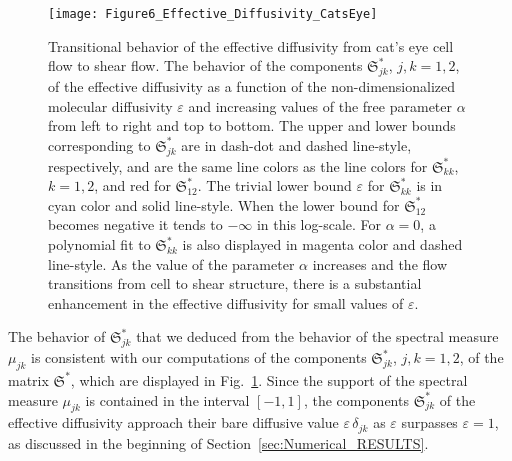 \documentclass[english,12pt,jmp,graphicx]{revtex4-1}
\newcommand{\secref}[1]{Section~\ref{#1}}
\newcommand{\figref}[1]{Fig.~\ref{#1}}
\newcommand{\Sg}{\mathfrak{S}}
\begin{document}
%
\begin{figure}[t]
  \centerline{\texttt{[image: Figure6\_Effective\_Diffusivity\_CatsEye]}} 
\caption{%
  Transitional behavior of the effective diffusivity from cat's eye
  cell flow to shear flow. The behavior of the components
  $\Sg^*_{jk}$, $j,k=1,2$, of the effective diffusivity as a function
  of the non-dimensionalized molecular diffusivity $\varepsilon$ and
  increasing values of 
  the free parameter $\alpha$ from left to right and top to bottom. The
  upper and lower bounds corresponding to $\Sg^*_{jk}$ are in dash-dot
  and dashed line-style, respectively, and are the same line colors as the line
  colors for $\Sg^*_{kk}$, $k=1,2$, and red for $\Sg^*_{12}$. The
  trivial lower bound $\varepsilon$ for $\Sg^*_{kk}$ 
  is in cyan color and solid line-style. When the lower bound for
  $\Sg^*_{12}$ becomes negative it tends to $-\infty$ in this
  log-scale. For $\alpha=0$, a polynomial
  fit to $\Sg_{kk}^*$ is also displayed in magenta color and dashed
  line-style. As the value of the parameter $\alpha$
  increases and the flow transitions from cell to shear structure,
  there is a substantial enhancement in the effective diffusivity for
  small values of $\varepsilon$. 
        }
\label{fig:Figure5_Effective_Diffusivity_CatsEye}
\end{figure}
%




The behavior of $\Sg_{jk}^*$ that we deduced from the behavior of the
spectral measure $\mu_{jk}$ is consistent with our computations of the
components $\Sg^*_{jk}$, $j,k=1,2$, of the matrix $\Sg^*$, which are
displayed in \figref{fig:Figure5_Effective_Diffusivity_CatsEye}.
Since the support of the
spectral measure $\mu_{jk}$ is contained in the interval $[-1,1]$, the
components $\Sg^*_{jk}$ of the effective diffusivity approach their
bare diffusive value $\varepsilon\,\delta_{jk}$ as $\varepsilon$
surpasses $\varepsilon=1$, as discussed in the beginning of
\secref{sec:Numerical_RESULTS}. 
\end{document}
